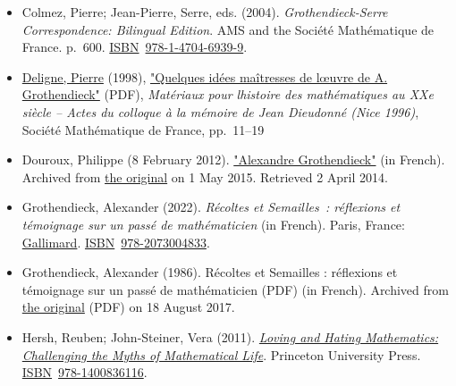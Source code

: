 \begin{itemize}
  \begin{itemize}
  \tightlist
  \item
    {\href{https://en.wikipedia.org/wiki/Jean_Dieudonné}{Dieudonné, Jean Alexandre}. "De L\textquotesingle analyse fonctionelle aux fondements de la géométrie algébrique". In \href{https://en.wikipedia.org/wiki/Alexander_Grothendieck\#CITEREFCartierIllusieKatzLaumon2007}{Cartier et al. (2007)}.}
  \end{itemize}
\item
  Colmez, Pierre; Jean-Pierre, Serre, eds. (2004). \emph{Grothendieck-Serre Correspondence: Bilingual Edition}. AMS and the Société Mathématique de France. p.{~}600. \href{https://en.wikipedia.org/wiki/ISBN_(identifier)}{ISBN}{~}\href{https://en.wikipedia.org/wiki/Special:BookSources/978-1-4704-6939-9}{978-1-4704-6939-9}.{}
\item
  \href{https://en.wikipedia.org/wiki/Pierre_Deligne}{Deligne, Pierre} (1998), \href{http://smf.emath.fr/Publications/SeminairesCongres/1998/3/pdf/smf_sem-cong_3_11-19.pdf}{"Quelques idées maîtresses de l\textquotesingle œuvre de A. Grothendieck"} {(PDF)}, \emph{Matériaux pour l\textquotesingle histoire des mathématiques au XXe siècle -- Actes du colloque à la mémoire de Jean Dieudonné (Nice 1996)}, Société Mathématique de France, pp.{~}{11--}19{}
\item
  Douroux, Philippe (8 February 2012). \href{https://web.archive.org/web/20150501034228/http://images.math.cnrs.fr/Alexandre-Grothendieck.html}{"Alexandre Grothendieck"} (in French). Archived from \href{http://images.math.cnrs.fr/Alexandre-Grothendieck.html}{the original} on 1 May 2015{. Retrieved {2 April} 2014}.{}
\item
  Grothendieck, Alexander (2022). \emph{Récoltes et Semailles{~}: réflexions et témoignage sur un passé de mathématicien} (in French). Paris, France: \href{https://en.wikipedia.org/wiki/Gallimard}{Gallimard}. \href{https://en.wikipedia.org/wiki/ISBN_(identifier)}{ISBN}{~}\href{https://en.wikipedia.org/wiki/Special:BookSources/978-2073004833}{978-2073004833}.{}
\item
  Grothendieck, Alexander (1986). Récoltes et Semailles : réflexions et témoignage sur un passé de mathématicien {(PDF)} (in French). Archived from \href{http://lipn.univ-paris13.fr/~duchamp/Books&more/Grothendieck/RS/pdf/RetS.pdf}{the original} {(PDF)} on 18 August 2017.{}
\item
  Hersh, Reuben; John-Steiner, Vera (2011). \href{https://books.google.com/books?id=gvsHAnAuIp4C&pg=PA109}{\emph{Loving and Hating Mathematics: Challenging the Myths of Mathematical Life}}. Princeton University Press. \href{https://en.wikipedia.org/wiki/ISBN_(identifier)}{ISBN}{~}\href{https://en.wikipedia.org/wiki/Special:BookSources/978-1400836116}{978-1400836116}.{}

\end{itemize}
